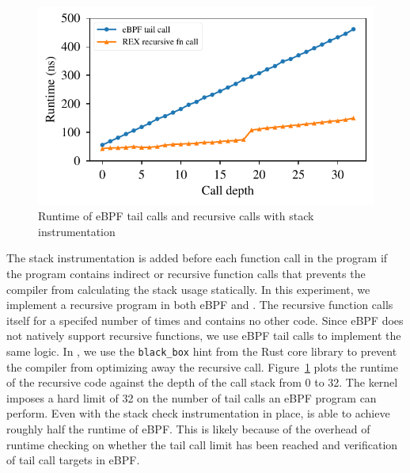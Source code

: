 \begin{figure}[t]
    \includegraphics[width=1.0\linewidth]{figs/recursive.pdf}
    \centering
    \vspace{-25pt}
    \caption{Runtime of eBPF tail calls and \projname{} recursive calls with
    stack instrumentation}
    \label{fig:eval-recursion}
    \vspace{-10pt}
\end{figure}
The stack instrumentation is added before each
    function call in the \projname{} program if the program contains indirect
    or recursive function calls that prevents the compiler from calculating the
    stack usage statically.
In this experiment, we implement a recursive program in both
    eBPF and \projname{}.
The recursive function calls itself for a specifed number of times and contains
    no other code.
Since eBPF does not natively support recursive functions, we use eBPF tail
    calls to implement the same logic.
In \projname{}, we use the \texttt{black\_box} hint from the Rust core library
    to prevent the compiler from optimizing away the recursive call.
Figure~\ref{fig:eval-recursion} plots the runtime of the recursive code against
    the depth of the call stack from 0 to 32.
The kernel imposes a hard limit of 32 on the number of tail calls an eBPF
    program can perform.
Even with the stack check instrumentation in place, \projname{} is able to
    achieve roughly half the runtime of eBPF.
This is likely because of the overhead of runtime checking on whether the tail
    call limit has been reached and verification of tail call targets in eBPF.
